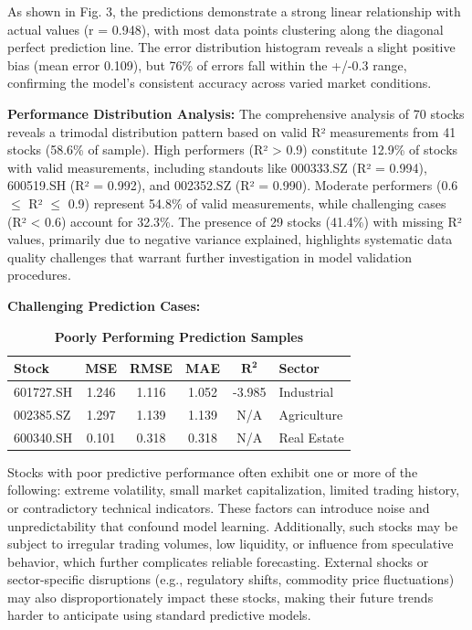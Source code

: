 \documentclass[3p,times,procedia]{elsarticle}
\begin{document}
As shown in Fig. 3, the predictions demonstrate a strong linear relationship with actual values (r = 0.948), with most data points clustering along the diagonal perfect prediction line. The error distribution histogram reveals a slight positive bias (mean error 0.109), but 76\% of errors fall within the +/-0.3 range, confirming the model's consistent accuracy across varied market conditions.

\textbf{Performance Distribution Analysis:} The comprehensive analysis of 70 stocks reveals a trimodal distribution pattern based on valid R² measurements from 41 stocks (58.6\% of sample). High performers (R² > 0.9) constitute 12.9\% of stocks with valid measurements, including standouts like 000333.SZ (R² = 0.994), 600519.SH (R² = 0.992), and 002352.SZ (R² = 0.990). Moderate performers (0.6 $\leq$ R² $\leq$ 0.9) represent 54.8\% of valid measurements, while challenging cases (R² < 0.6) account for 32.3\%. The presence of 29 stocks (41.4\%) with missing R² values, primarily due to negative variance explained, highlights systematic data quality challenges that warrant further investigation in model validation procedures.

\vspace{0.80cm}

\textbf{Challenging Prediction Cases:}

\begin{table}[!ht]
\renewcommand{\arraystretch}{1.5} %
\centering
\large %
\caption{\textbf{Poorly Performing Prediction Samples}}
\begin{tabular}{|l|c|c|c|c|l|}
\hline
\textbf{Stock} & \textbf{MSE} & \textbf{RMSE} & \textbf{MAE} & \textbf{$\mathbf{R^2}$} & \textbf{Sector} \\
\hline
601727.SH & 1.246 & 1.116 & 1.052 & -3.985 & Industrial \\
002385.SZ & 1.297 & 1.139 & 1.139 & N/A    & Agriculture \\
600340.SH & 0.101 & 0.318 & 0.318 & N/A    & Real Estate \\
\hline
\end{tabular}
\end{table}

Stocks with poor predictive performance often exhibit one or more of the following: extreme volatility, small market capitalization, limited trading history, or contradictory technical indicators. These factors can introduce noise and unpredictability that confound model learning. Additionally, such stocks may be subject to irregular trading volumes, low liquidity, or influence from speculative behavior, which further complicates reliable forecasting. External shocks or sector-specific disruptions (e.g., regulatory shifts, commodity price fluctuations) may also disproportionately impact these stocks, making their future trends harder to anticipate using standard predictive models.
\end{document}

